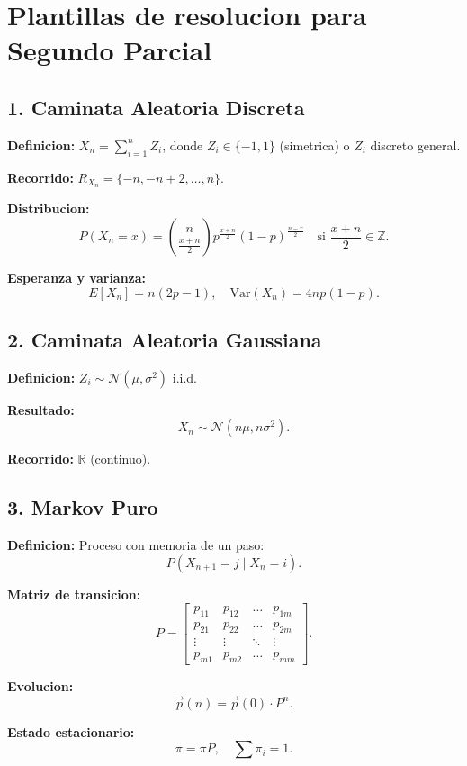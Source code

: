 \documentclass{article}
\begin{document}
\section{Plantillas de resolucion para Segundo Parcial}

\subsection{1. Caminata Aleatoria Discreta}

\textbf{Definicion:} $X_n = \sum_{i=1}^n Z_i$, donde $Z_i \in \{-1, 1\}$ (simetrica) o $Z_i$ discreto general.

\textbf{Recorrido:} $R_{X_n} = \{-n, -n+2, \dots, n\}$.

\textbf{Distribucion:}
\[
P(X_n = x) = \binom{n}{\frac{x+n}{2}} p^{\frac{x+n}{2}} (1-p)^{\frac{n-x}{2}} \quad \text{si } \frac{x+n}{2} \in \mathbb{Z}.
\]

\textbf{Esperanza y varianza:}
\[
E[X_n] = n (2p - 1), \quad \text{Var}(X_n) = 4n p(1-p).
\]

\subsection{2. Caminata Aleatoria Gaussiana}

\textbf{Definicion:} $Z_i \sim \mathcal{N}(\mu, \sigma^2)$ i.i.d.

\textbf{Resultado:}
\[
X_n \sim \mathcal{N}(n\mu, n\sigma^2).
\]

\textbf{Recorrido:} $\mathbb{R}$ (continuo).

\subsection{3. Markov Puro}

\textbf{Definicion:} Proceso con memoria de un paso:
\[
P(X_{n+1} = j \mid X_n = i).
\]

\textbf{Matriz de transicion:}
\[
P = \begin{bmatrix}
  p_{11} & p_{12} & \dots & p_{1m} \\
  p_{21} & p_{22} & \dots & p_{2m} \\
  \vdots & \vdots & \ddots & \vdots \\
  p_{m1} & p_{m2} & \dots & p_{mm}
\end{bmatrix}.
\]

\textbf{Evolucion:}
\[
\vec{p}(n) = \vec{p}(0) \cdot P^n.
\]

\textbf{Estado estacionario:}
\[
\pi = \pi P, \quad \sum \pi_i = 1.
\]
\end{document}
